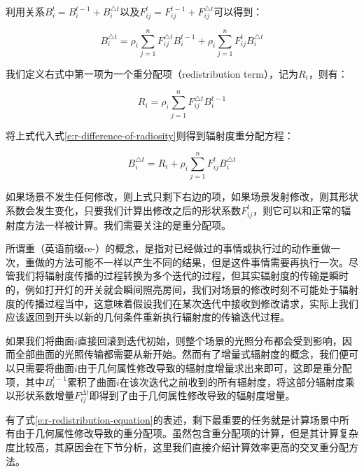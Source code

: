 \noindent 利用关系$B^{t}_i=B^{t-1}_i+B^{\triangle t}_i$以及$F^{t}_{ij}=F^{t-1}_{ij}+F^{\triangle t}_{ij}$可以得到：

\begin{equation}\label{e:r-difference-of-radiosity}
	B^{\triangle t}_i=\rho_i\sum^{n}_{j=1}F^{\triangle t}_{ij}B^{t-1}_i+\rho_i\sum^{n}_{j=1}F^{t}_{ij}B^{\triangle t}_i
\end{equation}

\noindent 我们定义右式中第一项为一个重分配项（redistribution term），记为$R_i$，则有：

\begin{equation}\label{e:r-redistribution-term}
	R_i=\rho_i\sum^{n}_{j=1}F^{\triangle t}_{ij}B^{t-1}_i
\end{equation}

\noindent 将上式代入式\ref{e:r-difference-of-radiosity}则得到辐射度重分配方程：

\begin{equation}\label{e:r-redistribution-equation}
	B^{\triangle t}_i=R_i+\rho_i\sum^{n}_{j=1}F^{t}_{ij}B^{\triangle t}_i
\end{equation}

\noindent 如果场景不发生任何修改，则上式只剩下右边的项，如果场景发射修改，则其形状系数会发生变化，只要我们计算出修改之后的形状系数$F^{t}_{ij}$，则它可以和正常的辐射度方法一样被计算。我们需要关注的是重分配项。

所谓重（英语前缀re-）的概念，是指对已经做过的事情或执行过的动作重做一次，重做的方法可能不一样以产生不同的结果，但是这件事情需要再执行一次。尽管我们将辐射度传播的过程转换为多个迭代的过程，但其实辐射度的传输是瞬时的，例如打开灯的开关就会瞬间照亮房间，我们对场景的修改时刻不可能处于辐射度的传播过程当中，这意味着假设我们在某次迭代中接收到修改请求，实际上我们应该返回到开头以新的几何条件重新执行辐射度的传输迭代过程。

如果我们将曲面$i$直接回滚到迭代初始，则整个场景的光照分布都会受到影响，因而全部曲面的光照传输都需要从新开始。然而有了增量式辐射度的概念，我们便可以只需要将曲面$i$由于几何属性修改导致的辐射度增量求出来即可，这即是重分配项，其中$B^{t-1}_i$累积了曲面$i$在该次迭代之前收到的所有辐射度，将这部分辐射度乘以形状系数增量$F^{\Delta t}_{ij}$即得到了由于几何属性修改导致的辐射度增量。

有了式\ref{e:r-redistribution-equation}的表述，剩下最重要的任务就是计算场景中所有由于几何属性修改导致的重分配项。虽然\cite{a:RadiosityRedistributionforDynamicEnvironments}包含重分配项的计算，但是其计算复杂度比较高，其原因会在下节分析，这里我们直接介绍计算效率更高的交叉重分配方法。




